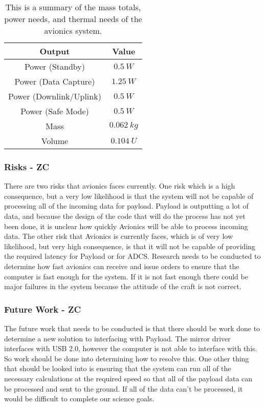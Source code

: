 \documentclass[12pt]{article}
\begin{document}
\begin{table}[ht]\label{table:avionics_summary_outputs}
\caption{This is a summary of the mass totals, power needs, and thermal needs of the avionics system.}
\begin{center}
    \begin{tabular}{|c||c|} \hline
    	Output & Value \\ \hline \hline
    Power (Standby) & $0.5\ W$  \\
    Power (Data Capture) & $1.25\ W$ \\
    Power (Downlink/Uplink) & $0.5\ W$ \\
    Power (Safe Mode) & $0.5\ W$ \\
    Mass & $0.062\ kg$  \\
    Volume & $0.104\ U$ \\ \hline 
    \end{tabular}
\end{center}
\end{table}

			\subsubsection{Risks - ZC}
There are two risks that avionics faces currently. One risk which is a high consequence, but a very low likelihood is that the system will not be capable of processing all of the incoming data for payload. Payload is outputting a lot of data, and because the design of the code that will do the process has not yet been done, it is unclear how quickly Avionics will be able to process incoming data. The other risk that Avionics is currently faces, which is of very low likelihood, but very high consequence, is that it will not be capable of providing the required latency for Payload or for ADCS. Research needs to be conducted to determine how fast avionics can receive and issue orders to ensure that the computer is fast enough for the system. If it is not fast enough there could be major failures in the system because the attitude of the craft is not correct.

			\subsubsection{Future Work - ZC}
The future work that needs to be conducted is that there should be work done to determine a new solution to interfacing with Payload. The mirror driver interfaces with USB 2.0, however the computer is not able to interface with this. So work should be done into determining how to resolve this. One other thing that should be looked into is ensuring that the system can run all of the necessary calculations at the required speed so that all of the payload data can be processed and sent to the ground. If all of the data can’t be processed, it would be difficult to complete our science goals.
\end{document}
